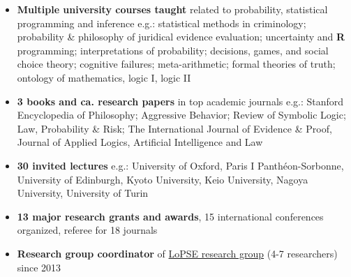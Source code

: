 \documentclass[10pt, a4paper]{article}
\begin{document}
\vspace{-6mm}

\begin{itemize}[leftmargin=*]
	 \setlength{\itemsep}{0pt}\scriptsize
	\item \normalsize  \textbf{Multiple university courses taught} related to probability, statistical programming and inference
	\newline
	\scriptsize e.g.: statistical methods in criminology; probability \& philosophy of juridical evidence evaluation; uncertainty and \textbf{\textsf{R}} programming; interpretations of probability; decisions, games, and social choice theory; cognitive failures; meta-arithmetic; formal theories of truth; ontology of mathematics, logic I, logic II
	
	\item \normalsize  \textbf{3 books and ca. research papers} in top academic journals\newline
	\scriptsize e.g.: Stanford Encyclopedia of Philosophy; Aggressive Behavior; Review of Symbolic Logic; Law, Probability \& Risk; The International Journal of Evidence \& Proof, Journal of Applied Logics, Artificial Intelligence and Law 
	
	\item \normalsize \textbf{30 invited lectures}
	 \newline
	 \scriptsize e.g.: University of Oxford, Paris I Panth\'eon-Sorbonne, University of Edinburgh,   Kyoto University, Keio University, Nagoya University,  University of Turin
	 
	 \vspace{-2mm}	  
	\scriptsize 
	 \item \normalsize  \textbf{13 major research grants and awards}, 15  international conferences organized,   referee for 18  journals
	
	
	\vspace{-2mm} \scriptsize 
	\item \normalsize \textbf{Research group coordinator} of \href{http://lopsegdansk.blogspot.com/p/lopse-team.html}{LoPSE research group} (4-7 researchers) since 2013
		
	
	
\end{itemize}
\thispagestyle{empty}















%
\end{document}
